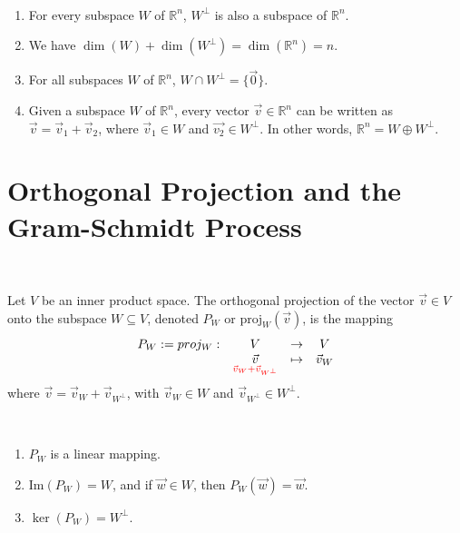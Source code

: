 \documentclass[11pt,fleqn]{book} %
\begin{document}
\setcounter{chapter}{4}
\setcounter{section}{4}
\setcounter{dummy}{2}
\begin{proposition}
{~~~}

    \begin{enumerate}[label=\alph*)]
        \item For every subspace $W$ of $\mathbb{R}^n$, $W^\perp$ is also a subspace of $\mathbb{R}^n$.
        \item We have $\dim(W) + \dim(W^\perp) = \dim(\mathbb{R}^n) = n$.
        \item For all subspaces $W$ of $\mathbb{R}^n$, $W \cap W^\perp = \{ \vec{0} \}$.
        \item Given a subspace $W$ of $\mathbb{R}^n$, every vector $\vec{v} \in \mathbb{R}^n$ can be written  as $\vec{v} = \vec{v}_1 + \vec{v}_2$, where $\vec{v}_1 \in W$ and $\vec{v_2} \in W^\perp$. In other words, $\mathbb{R}^n = W \oplus W^\perp$.
    \end{enumerate}
\end{proposition}
\setcounter{section}{3}
\setcounter{chapter}{3}

\section{Orthogonal Projection and the Gram-Schmidt Process}

\setcounter{section}{0}
\setcounter{definitionT}{3}
\begin{definition}
{~~~}

    Let $V$ be an inner product space. The orthogonal projection of the vector $\vec{v} \in V$ onto the subspace $W \subseteq V$, denoted $P_W$ or $\mathrm{proj}_W(\vec{v})$, is the mapping 
    $$\begin{matrix}P_W := proj_W: &V &\to &V \\ &\underset{\color{red}\vec{v}_W + \vec{v}_{W^\perp}}{\vec{v}} &\mapsto &\vec{v}_W\end{matrix}$$ 
    where $\vec{v} = \vec{v}_W + \vec{v}_{W^\perp}$, with $\vec{v}_W \in W$ and $\vec{v}_{W^\perp} \in W^\perp$. 
\end{definition}
\setcounter{section}{4}

\setcounter{chapter}{4}
\setcounter{dummy}{4}
\begin{proposition}
{~~~}

    \begin{enumerate}[label=\alph*)]
        \item $P_W$ is a linear mapping.
        \item $\mathrm{Im}(P_W) = W$, and if $\vec{w} \in W$, then $P_W(\vec{w}) = \vec{w}$.
        \item $\ker(P_W) = W^\perp$. 
    \end{enumerate}
\end{proposition}
\end{document}
